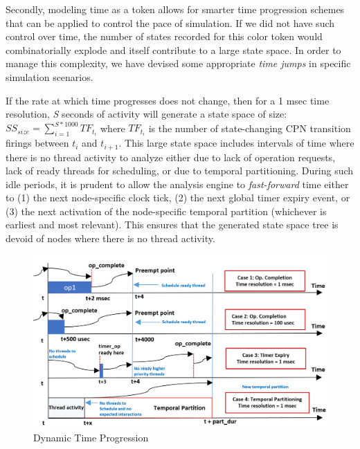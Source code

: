 Secondly, modeling time as a token allows for smarter time progression schemes that can be applied to control the pace of simulation. If we did not have such control over time, the number of states recorded for this color token would combinatorially explode and itself contribute to a large state space. In order to manage this complexity, we have devised some appropriate \emph{time jumps} in specific simulation scenarios. 

If the rate at which time progresses does not change, then for a 1 msec time resolution, \emph{S} seconds of activity will generate a state space of size: $SS_{size} = \sum\limits_{i=1}^{S*1000} TF_{t_i}$ where $TF_{t_i}$ is the number of state-changing CPN transition firings between $t_i$ and $t_{i+1}$. This large state space includes intervals of time where there is no thread activity to analyze either due to lack of operation requests, lack of ready threads for scheduling, or due to temporal partitioning. During such idle periods, it is prudent to allow the analysis engine to \emph{fast-forward} time either to (1) the next node-specific clock tick, (2) the next global timer expiry event, or (3) the next activation of the node-specific temporal partition (whichever is earliest and most relevant). This ensures that the generated state space tree is devoid of nodes where there is no thread activity.

\begin{figure}[h]
	\centering
	\includegraphics[width=\textwidth]{./img/time}
	\caption{Dynamic Time Progression}
	\label{fig:time}
\end{figure}

